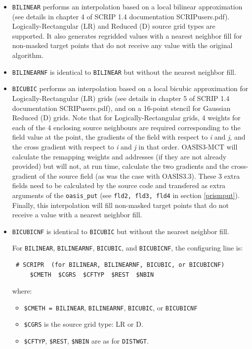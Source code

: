 \begin{itemize}
\begin{itemize}
  \item {\tt BILINEAR} performs an interpolation based on a local
    bilinear approximation (see details in chapter 4 of SCRIP 1.4
    documentation SCRIPusers.pdf). Logically-Rectangular (LR) and
    Reduced (D) source grid types are supported.  It also generates
    regridded values with a nearest neighbor fill for non-masked
    target points that do not receive any value with the original algorithm.

  \item {\tt BILINEARNF} is identical to {\tt BILINEAR} but without the
    nearest neighbor fill.

  \item {\tt BICUBIC} performs an interpolation based on a local
    bicubic approximation for Logically-Rectangular (LR) grids (see
    details in chapter 5 of SCRIP 1.4 documentation SCRIPusers.pdf),
    and on a 16-point stencil for Gaussian Reduced (D) grids.  Note
    that for Logically-Rectangular grids, 4 weights for each of the 4
    enclosing source neighbours are required corresponding to the
    field value at the point, the gradients of the field with respect
    to {\it i} and {\it j}, and
    the cross gradient with respect to {\it i} and {\it j} in that
    order. OASIS3-MCT will calculate the remapping weights and
    addresses (if they are not already provided) but will not, at run
    time, calculate the two gradients and the cross-gradient of the
    source field (as was the case with OASIS3.3). These 3 extra fields
    need to be calculated by the source code and transfered as extra
    arguments of the {\tt oasis\_put} (see {\tt fld2, fld3, fld4} in
    section \ref{prismput}).  Finally, this interpolation will fill
    non-masked target points that do not receive a value with a nearest neighbor fill.

  \item {\tt BICUBICNF} is identical to {\tt BICUBIC} but without the
    nearest neighbor fill.
 
    For {\tt BILINEAR}, {\tt BILINEARNF}, {\tt BICUBIC}, and {\tt BICUBICNF}, the configuring line
    is:

  \begin{verbatim}
 # SCRIPR  (for BILINEAR, BILINEARNF, BICUBIC, or BICUBICNF)
     $CMETH  $CGRS  $CFTYP  $REST  $NBIN
\end{verbatim}
    \vspace{-0.5cm} where:
    \begin{itemize}
    \item {\tt \$CMETH = BILINEAR}, {\tt BILINEARNF}, {\tt BICUBIC}, or {\tt BICUBICNF}
    \item {\tt \$CGRS} is the source grid type: LR or D.
    \item {\tt \$CFTYP}, {\tt \$REST}, {\tt \$NBIN} are as for {\tt DISTWGT}.
    \end{itemize}
    

\end{itemize}
\end{itemize}
